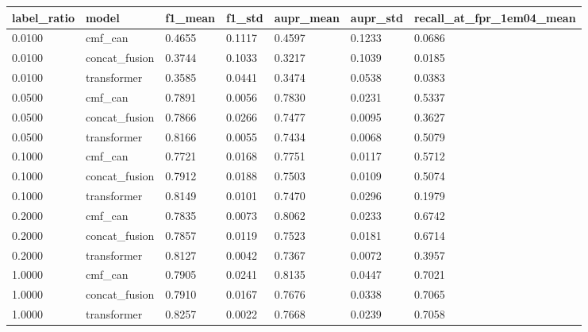 \begin{tabular}{lllllll}
\toprule
label\_ratio & model & f1\_mean & f1\_std & aupr\_mean & aupr\_std & recall\_at\_fpr\_1em04\_mean \\
\midrule
0.0100 & cmf\_can & 0.4655 & 0.1117 & 0.4597 & 0.1233 & 0.0686 \\
0.0100 & concat\_fusion & 0.3744 & 0.1033 & 0.3217 & 0.1039 & 0.0185 \\
0.0100 & transformer & 0.3585 & 0.0441 & 0.3474 & 0.0538 & 0.0383 \\
0.0500 & cmf\_can & 0.7891 & 0.0056 & 0.7830 & 0.0231 & 0.5337 \\
0.0500 & concat\_fusion & 0.7866 & 0.0266 & 0.7477 & 0.0095 & 0.3627 \\
0.0500 & transformer & 0.8166 & 0.0055 & 0.7434 & 0.0068 & 0.5079 \\
0.1000 & cmf\_can & 0.7721 & 0.0168 & 0.7751 & 0.0117 & 0.5712 \\
0.1000 & concat\_fusion & 0.7912 & 0.0188 & 0.7503 & 0.0109 & 0.5074 \\
0.1000 & transformer & 0.8149 & 0.0101 & 0.7470 & 0.0296 & 0.1979 \\
0.2000 & cmf\_can & 0.7835 & 0.0073 & 0.8062 & 0.0233 & 0.6742 \\
0.2000 & concat\_fusion & 0.7857 & 0.0119 & 0.7523 & 0.0181 & 0.6714 \\
0.2000 & transformer & 0.8127 & 0.0042 & 0.7367 & 0.0072 & 0.3957 \\
1.0000 & cmf\_can & 0.7905 & 0.0241 & 0.8135 & 0.0447 & 0.7021 \\
1.0000 & concat\_fusion & 0.7910 & 0.0167 & 0.7676 & 0.0338 & 0.7065 \\
1.0000 & transformer & 0.8257 & 0.0022 & 0.7668 & 0.0239 & 0.7058 \\
\bottomrule
\end{tabular}
